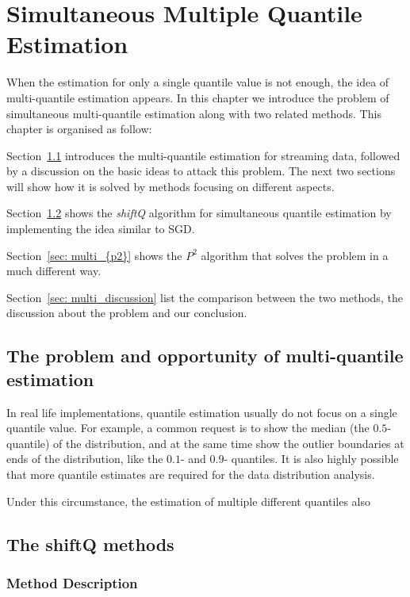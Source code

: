 \chapter{Simultaneous Multiple Quantile Estimation}
\label{ch: multi_quant}

\graphicspath{{Figures/Multi/}{./}} 

When the estimation for only a single quantile value is not enough, the idea of multi-quantile estimation appears. 
In this chapter we introduce the problem of simultaneous multi-quantile estimation along with two related methods. This chapter is organised as follow:

Section~\ref{sec: multi_intro} introduces the multi-quantile estimation for streaming data, followed by a discussion on the basic ideas to attack this problem. The next two sections will show how it is solved by methods focusing on different aspects.

Section~\ref{sec: multi_shiftQ} shows the \textit{shiftQ} algorithm for simultaneous quantile estimation by implementing the idea similar to SGD.

Section~\ref{sec: multi_{p2}} shows the \textit{$P^2$} algorithm that solves the problem in a much different way.

Section~\ref{sec: multi_discussion} list the comparison between the two methods, the discussion about the problem and our conclusion.

\section{The problem and opportunity of multi-quantile estimation}
\label{sec: multi_intro}

In real life implementations, quantile estimation usually do not focus on a single quantile value. For example, a common request is to show the median (the $0.5$-quantile) of the distribution, and at the same time show the outlier boundaries at ends of the distribution, like the $0.1$- and $0.9$- quantiles. It is also highly possible that more quantile estimates are required for the data distribution analysis.

Under this circumstance, the estimation of multiple different quantiles also 

\section{The shiftQ methods}
\label{sec: multi_shiftQ}

\subsection{Method Description}

